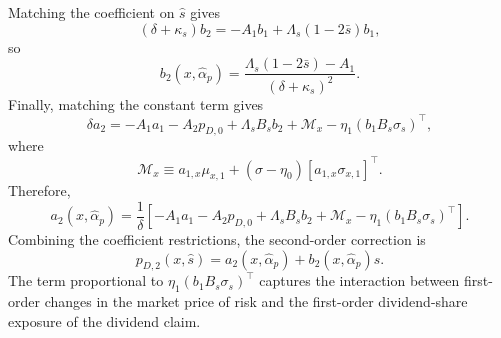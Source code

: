 Matching the coefficient on $\hat{s}$ gives
\begin{equation}
    (\delta+\kappa_s)b_2
    =-A_1b_1+\Lambda_s(1-2\bar{s})b_1,
\end{equation}
so
\begin{equation}
    b_2(x,\hat{\alpha}_p)
    =\frac{\Lambda_s(1-2\bar{s})-A_1}{(\delta+\kappa_s)^2}.
\end{equation}
Finally, matching the constant term gives
\begin{equation}
    \delta a_2
    =-A_1a_1-A_2p_{D,0}+\Lambda_sB_sb_2+\mathcal{M}_x
    -\eta_1\left(b_1B_s\sigma_s\right)^\top,
\end{equation}
where
\begin{equation}
    \mathcal{M}_x
    \equiv a_{1,x}\mu_{x,1}
    +(\sigma-\eta_0)\left[a_{1,x}\sigma_{x,1}\right]^\top.
\end{equation}
Therefore,
\begin{equation}
    a_2(x,\hat{\alpha}_p)
    =\frac{1}{\delta}\left[
        -A_1a_1-A_2p_{D,0}+\Lambda_sB_sb_2+\mathcal{M}_x
        -\eta_1\left(b_1B_s\sigma_s\right)^\top
    \right].
\end{equation}
Combining the coefficient restrictions, the second-order correction is
\begin{equation}
    p_{D,2}(x,\hat{s})=a_2(x,\hat{\alpha}_p)+b_2(x,\hat{\alpha}_p)\hat{s}.
\end{equation}
The term proportional to $\eta_1(b_1B_s\sigma_s)^\top$ captures the interaction between first-order changes in the market price of risk and the first-order dividend-share exposure of the dividend claim.

